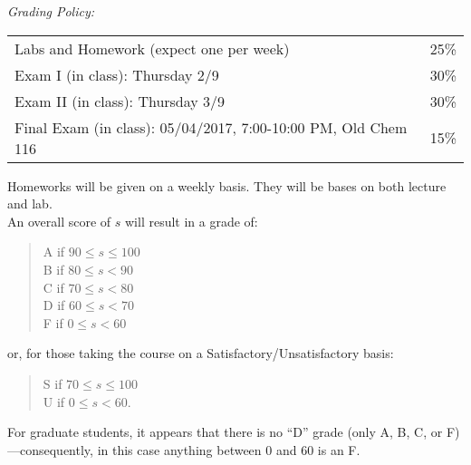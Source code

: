 \documentclass[11pt]{article}
\begin{document}



\emph{Grading Policy:} 
\begin{table}[htdp]
\begin{tabular}{ll}


Labs and Homework (expect one per week) & 25\%\\
Exam I  (in class):  Thursday 2/9 & 30\%\\
Exam II  (in class): Thursday 3/9 & 30\%\\
Final Exam (in class): 05/04/2017, 7:00-10:00 PM, Old Chem 116 & 15\%\\
\end{tabular}
\label{default}
\end{table}%

Homeworks will be given on a weekly basis. They will be bases on both lecture and lab. \\

An overall score of $s$ will result in a grade of:
\begin{quote}
A if $90\leq s\leq 100$ \\
B if $80\leq s < 90$ \\
C if $70\leq s < 80$ \\
D if $60\leq s < 70$ \\
F if $0\leq s < 60$
\end{quote}
or, for those taking the course on a Satisfactory/Unsatisfactory basis:
\begin{quote}
S if $70\leq s\leq 100$ \\
U if $0\leq s < 60$.
\end{quote}
For graduate students, it appears that there is no ``D'' grade (only A, B, C, or F)---consequently, in this case anything between $0$ and $60$ is an F. \\
\end{document}
